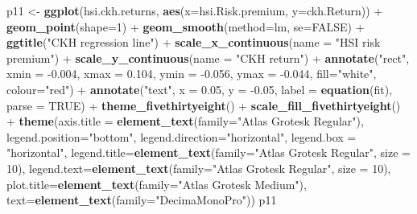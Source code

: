 \documentclass[]{article}
\newenvironment{Shaded}{\begin{snugshade}}{\end{snugshade}}
\newcommand{\KeywordTok}[1]{\textcolor[rgb]{0.13,0.29,0.53}{\textbf{{#1}}}}
\newcommand{\DataTypeTok}[1]{\textcolor[rgb]{0.13,0.29,0.53}{{#1}}}
\newcommand{\DecValTok}[1]{\textcolor[rgb]{0.00,0.00,0.81}{{#1}}}
\newcommand{\FloatTok}[1]{\textcolor[rgb]{0.00,0.00,0.81}{{#1}}}
\newcommand{\StringTok}[1]{\textcolor[rgb]{0.31,0.60,0.02}{{#1}}}
\newcommand{\OtherTok}[1]{\textcolor[rgb]{0.56,0.35,0.01}{{#1}}}
\newcommand{\NormalTok}[1]{{#1}}
\begin{document}
\begin{Shaded}
\begin{Highlighting}[]
\NormalTok{p11 <-}\StringTok{ }\KeywordTok{ggplot}\NormalTok{(hsi.ckh.returns, }\KeywordTok{aes}\NormalTok{(}\DataTypeTok{x=}\NormalTok{hsi.Risk.premium, }\DataTypeTok{y=}\NormalTok{ckh.Return)) +}\StringTok{ }\KeywordTok{geom_point}\NormalTok{(}\DataTypeTok{shape=}\DecValTok{1}\NormalTok{) +}\StringTok{ }\KeywordTok{geom_smooth}\NormalTok{(}\DataTypeTok{method=}\NormalTok{lm, }\DataTypeTok{se=}\OtherTok{FALSE}\NormalTok{) +}
\StringTok{  }\KeywordTok{ggtitle}\NormalTok{(}\StringTok{"CKH regression line"}\NormalTok{) +}
\StringTok{  }\KeywordTok{scale_x_continuous}\NormalTok{(}\DataTypeTok{name =} \StringTok{"HSI risk premium"}\NormalTok{) +}
\StringTok{  }\KeywordTok{scale_y_continuous}\NormalTok{(}\DataTypeTok{name =} \StringTok{"CKH return"}\NormalTok{) +}
\StringTok{  }\KeywordTok{annotate}\NormalTok{(}\StringTok{"rect"}\NormalTok{, }\DataTypeTok{xmin =} \NormalTok{-}\FloatTok{0.004}\NormalTok{, }\DataTypeTok{xmax =} \FloatTok{0.104}\NormalTok{, }\DataTypeTok{ymin =} \NormalTok{-}\FloatTok{0.056}\NormalTok{, }\DataTypeTok{ymax =} \NormalTok{-}\FloatTok{0.044}\NormalTok{, }\DataTypeTok{fill=}\StringTok{"white"}\NormalTok{, }
    \DataTypeTok{colour=}\StringTok{"red"}\NormalTok{) +}\StringTok{ }
\StringTok{  }\KeywordTok{annotate}\NormalTok{(}\StringTok{"text"}\NormalTok{, }\DataTypeTok{x =} \FloatTok{0.05}\NormalTok{, }\DataTypeTok{y =} \NormalTok{-}\FloatTok{0.05}\NormalTok{, }\DataTypeTok{label =} \KeywordTok{equation}\NormalTok{(fit), }\DataTypeTok{parse =} \OtherTok{TRUE}\NormalTok{) +}\StringTok{ }
\StringTok{  }\KeywordTok{theme_fivethirtyeight}\NormalTok{() +}\StringTok{ }\KeywordTok{scale_fill_fivethirtyeight}\NormalTok{() +}\StringTok{   }
\StringTok{  }\KeywordTok{theme}\NormalTok{(}\DataTypeTok{axis.title =} \KeywordTok{element_text}\NormalTok{(}\DataTypeTok{family=}\StringTok{"Atlas Grotesk Regular"}\NormalTok{),}
    \DataTypeTok{legend.position=}\StringTok{"bottom"}\NormalTok{, }
    \DataTypeTok{legend.direction=}\StringTok{"horizontal"}\NormalTok{,}
    \DataTypeTok{legend.box =} \StringTok{"horizontal"}\NormalTok{, }
    \DataTypeTok{legend.title=}\KeywordTok{element_text}\NormalTok{(}\DataTypeTok{family=}\StringTok{"Atlas Grotesk Regular"}\NormalTok{, }\DataTypeTok{size =} \DecValTok{10}\NormalTok{),}
    \DataTypeTok{legend.text=}\KeywordTok{element_text}\NormalTok{(}\DataTypeTok{family=}\StringTok{"Atlas Grotesk Regular"}\NormalTok{, }\DataTypeTok{size =} \DecValTok{10}\NormalTok{),}
    \DataTypeTok{plot.title=}\KeywordTok{element_text}\NormalTok{(}\DataTypeTok{family=}\StringTok{"Atlas Grotesk Medium"}\NormalTok{), }
    \DataTypeTok{text=}\KeywordTok{element_text}\NormalTok{(}\DataTypeTok{family=}\StringTok{"DecimaMonoPro"}\NormalTok{))}
\NormalTok{p11}
\end{Highlighting}
\end{Shaded}
\end{document}
